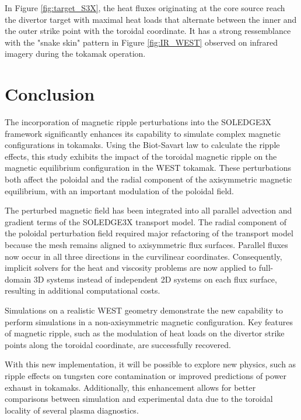 In Figure \ref{fig:target_S3X}, the heat fluxes originating at the core source reach the divertor target with maximal heat loads that alternate between the inner and the outer strike point with the toroidal coordinate. It has a strong ressemblance with the "snake skin" pattern in Figure \ref{fig:IR_WEST} observed on infrared imagery during the tokamak operation. 


\section{Conclusion}
The incorporation of magnetic ripple perturbations into the SOLEDGE3X framework significantly enhances its capability to simulate complex magnetic configurations in tokamaks. Using the Biot-Savart law to calculate the ripple effects, this study exhibits the impact of the toroidal magnetic ripple on the magnetic equilibrium configuration in the WEST tokamak. These perturbations both affect the poloidal and the radial component of the axisymmetric magnetic equilibrium, with an important modulation of the poloidal field. \newline

The perturbed magnetic field has been integrated into all parallel advection and gradient terms of the SOLEDGE3X transport model. The radial component of the poloidal perturbation field required major refactoring of the transport model because the mesh remains aligned to axisymmetric flux surfaces. Parallel fluxes now occur in all three directions in the curvilinear coordinates. Consequently, implicit solvers for the heat and viscosity problems are now applied to full-domain 3D systems instead of independent 2D systems on each flux surface, resulting in additional computational costs. \newline

Simulations on a realistic WEST geometry demonstrate the new capability to perform simulations in a non-axisymmetric magnetic configuration. Key features of magnetic ripple, such as the modulation of heat loads on the divertor strike points along the toroidal coordinate, are successfully recovered. \newline

With this new implementation, it will be possible to explore new physics, such as ripple effects on tungsten core contamination or improved predictions of power exhaust in tokamaks. Additionally, this enhancement allows for better comparisons between simulation and experimental data due to the toroidal locality of several plasma diagnostics.
